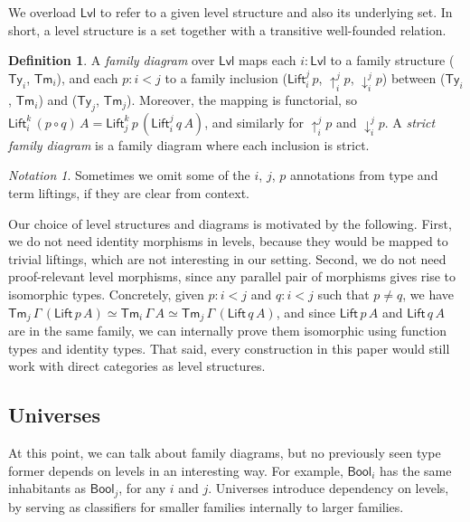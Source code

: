 \documentclass[a4paper,UKenglish,cleveref, autoref, thm-restate]{lipics-v2021}
\theoremstyle{remark}
\newtheorem{notation}{Notation}
\theoremstyle{definition}
\newtheorem{mydefinition}{Definition}
\newcommand{\Ty}{\mathsf{Ty}}
\newcommand{\Tm}{\mathsf{Tm}}
\newcommand{\Bool}{\mathsf{Bool}}
\newcommand{\up}{{\uparrow}}
\newcommand{\down}{{\downarrow}}
\newcommand{\Lift}{\mathsf{Lift}}
\newcommand{\Lvl}{\mathsf{Lvl}}
\begin{document}
\noindent We overload $\Lvl$ to refer to a given level structure and also its
underlying set. In short, a level structure is a set together with a transitive
well-founded relation.

\begin{mydefinition}
A \emph{family diagram} over $\Lvl$ maps each $i : \Lvl$ to a family structure
($\Ty_i$, $\Tm_i$), and each $p : i < j$ to a family inclusion
($\Lift_{i}^{j}\,p$, $\up_{i}^{j}p$, $\down_{i}^{j}p$) between ($\Ty_i$,
$\Tm_i$) and ($\Ty_j$, $\Tm_j$). Moreover, the mapping is functorial, so
$\Lift_{i}^{k}\,(p\circ q)\,A = \Lift_{j}^{k}\,p\,(\Lift_{i}^{j}\,q\,A)$, and
similarly for $\up_{i}^{j}p$ and $\down_{i}^{j}p$. A \emph{strict family diagram}
is a family diagram where each inclusion is strict.
\end{mydefinition}

\begin{notation}
Sometimes we omit some of the $i$, $j$, $p$ annotations from type and term
liftings, if they are clear from context.
\end{notation}

Our choice of level structures and diagrams is motivated by the following.  First, we do not need
identity morphisms in levels, because they would be mapped to trivial liftings, which are not
interesting in our setting. Second, we do not need proof-relevant level morphisms, since any
parallel pair of morphisms gives rise to isomorphic types. Concretely, given $p : i < j$ and $q : i
< j$ such that $p \neq q$, we have $\Tm_j\,\Gamma\,(\Lift\,p\,A) \simeq \Tm_i\,\Gamma\,A \simeq
\Tm_j\,\Gamma\,(\Lift\,q\,A)$, and since $\Lift\,p\,A$ and $\Lift\,q\,A$ are in the same family, we
can internally prove them isomorphic using function types and identity types. That said, every
construction in this paper would still work with direct categories as level structures.

\subsection{Universes}
\label{sec:universes}

At this point, we can talk about family diagrams, but no previously seen type
former depends on levels in an interesting way. For example, $\Bool_i$ has the
same inhabitants as $\Bool_j$, for any $i$ and $j$. Universes introduce
dependency on levels, by serving as classifiers for smaller families internally
to larger families.
\end{document}
